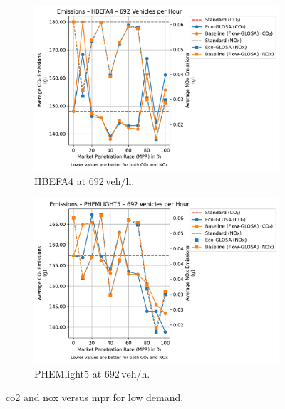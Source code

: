 \begin{figure}[htb]
  \centering
  \begin{subfigure}[b]{0.45\textwidth}
    \includegraphics[width=\textwidth]{data/img/Emissions/Emissions_HBEFA4_Cars692.pdf}
    \caption{HBEFA4 at $692\,\mathrm{veh/h}$.}
    \label{fig:Emis_692_HBEFA4}
  \end{subfigure}\hfill
  \begin{subfigure}[b]{0.45\textwidth}
    \includegraphics[width=\textwidth]{data/img/Emissions/Emissions_PHEMLIGHT5_Cars692.pdf}
    \caption{PHEMlight5 at $692\,\mathrm{veh/h}$.}
    \label{fig:Emis_692_PHEM}
  \end{subfigure}
  \caption{\ac{co2} and \ac{nox} versus \ac{mpr} for low demand.}
  \label{fig:Emis_692}
\end{figure}

